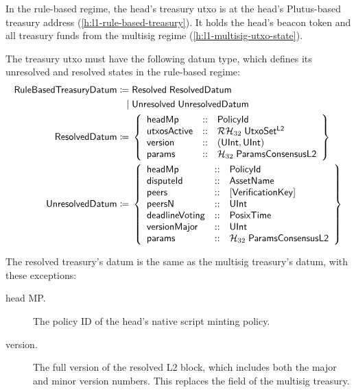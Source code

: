 \documentclass[../hydrozoa.tex]{subfiles}
\begin{document}
In the rule-based regime, the head's treasury utxo is at the head's Plutus-based treasury address (\cref{h:l1-rule-based-treasury}).
It holds the head's beacon token and all treasury funds from the multisig regime (\cref{h:l1-multisig-utxo-state}).

The treasury utxo must have the following datum type, which defines its unresolved and resolved states in the rule-based regime:
\begin{equation*}
\begin{split}
  \mathsf{RuleBasedTreasuryDatum} \coloneq&\;
    \mathsf{Resolved} \; \mathsf{ResolvedDatum} \\\mid&\;
    \mathsf{Unresolved} \; \mathsf{UnresolvedDatum} \\
  \mathsf{ResolvedDatum} \coloneq&\;\left\{
    \begin{array}{lll}
      \mathsf{headMp} &::& \mathsf{PolicyId} \\
      \mathsf{utxosActive}  &::& \mathcal{RH}_{32} \; \mathsf{UtxoSet^{L2}} \\
      \mathsf{version} &::& (\mathsf{UInt}, \mathsf{UInt}) \\
      \mathsf{params} &::& \mathcal{H}_{32} \; \mathsf{ParamsConsensusL2}
    \end{array}\right\} \\
  \mathsf{UnresolvedDatum} \coloneq&\;\left\{
    \begin{array}{lll}
      \mathsf{headMp} &::& \mathsf{PolicyId} \\
      \mathsf{disputeId} &::& \mathsf{AssetName} \\
      \mathsf{peers} &::& \mathsf{[VerificationKey]} \\
      \mathsf{peersN} &::& \mathsf{UInt} \\
      \mathsf{deadlineVoting} &::& \mathsf{PosixTime} \\
      \mathsf{versionMajor} &::& \mathsf{UInt} \\
      \mathsf{params} &::& \mathcal{H}_{32} \; \mathsf{ParamsConsensusL2}
    \end{array}\right\}
\end{split}
\end{equation*}

The resolved treasury's datum is the same as the multisig treasury's datum, with these exceptions:
\begin{description}
  \item[head MP.] The policy ID of the head's native script minting policy.
  \item[version.] The full version of the resolved L2 block, which includes both the major and minor version numbers. This replaces the  field of the multisig treasury.
\end{description}
\end{document}
